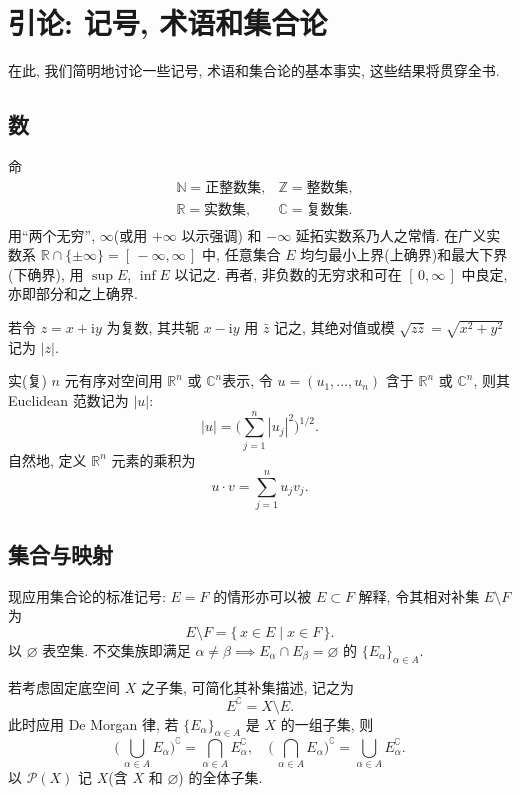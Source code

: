\chapter*{引论: 记号, 术语和集合论}
在此, 我们简明地讨论一些记号, 术语和集合论的基本事实, 这些结果将贯穿全书.
\section{数}
命
\[
    \begin{aligned}
         & \mathbb N  =\textit{正整数集},
         & \mathbb Z  =\textit{整数集},   \\
         & \mathbb R  =\textit{实数集},
         & \mathbb C  =\textit{复数集}.   \\
    \end{aligned}
\]
用``两个无穷'', $\infty$(或用 $+\infty$ 以示强调) 和 $-\infty$ 延拓实数系乃人之常情. 在广义实数系 $\mathbb R\cap\{\pm\infty\}=[\,-\infty,\infty\,]$ 中, 任意集合 $E$ 均匀最小上界(上确界)和最大下界(下确界), 用 $\sup E$, $\inf E$ 以记之. 再者, 非负数的无穷求和可在 $[\,0,\infty\,]$ 中良定, 亦即部分和之上确界.

若令 $z=x+\mathrm iy$ 为复数, 其共轭 $x-\mathrm iy$ 用 $\bar z$ 记之, 其绝对值或模 $\sqrt{z\bar z} = \sqrt{x^2 + y^2}$ 记为 $|z|$.

实(复) $n$ 元有序对空间用 $\mathbb R^n$ 或 $\mathbb C^n$表示, 令 $u=(u_1,\dots,u_n)$ 含于 $\mathbb R^n$ 或 $\mathbb C^n$, 则其 Euclidean 范数记为 $|u|$:
\[
    |u| = \biggl( \sum_{j=1}^n |u_j|^2 \biggr) ^{1 /2}
    .\]
自然地, 定义 $\mathbb R^n$ 元素的乘积为
\[
    u\cdot v=\sum_{j=1}^n u_j v_j
    .\]
\section{集合与映射}
现应用集合论的标准记号: $E=F$ 的情形亦可以被 $E\subset F$ 解释, 令其相对补集 $E\setminus F$ 为
\[
    E\setminus F = \{\, x\in E \mid x\in F \,\}.
\]
以 $\varnothing$ 表空集. 不交集族即满足 $\alpha \neq \beta \implies E_\alpha\cap E_ \beta =\varnothing$ 的 $\{E_\alpha\}_{\alpha\in A}$.

若考虑固定底空间 $X$ 之子集, 可简化其补集描述, 记之为
\[
    E^\complement  = X\setminus E.
\]
此时应用 De Morgan 律, 若 $\{E_\alpha\}_{\alpha\in A}$ 是 $X$ 的一组子集, 则
\[
    \biggl(\, \bigcup_{\alpha\in A}E_\alpha \biggr)^\complement = \bigcap_{\alpha\in A}E_\alpha^\complement,\quad\biggl(\, \bigcap_{\alpha\in A}E_\alpha \biggr)^\complement = \bigcup_{\alpha\in A}E_\alpha^\complement.
\]
以 $\mathcal P(X)$ 记 $X$(含 $X$ 和 $\varnothing$) 的全体子集.

